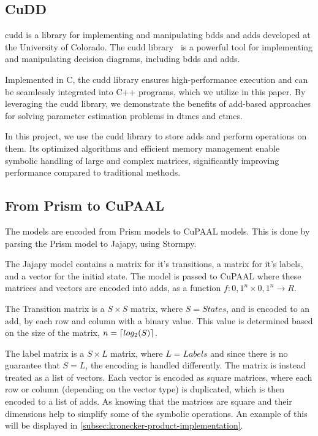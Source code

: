 \subsection{CuDD}\label{subsec:cudd}
\acrfull{cudd} is a library for implementing and manipulating \glspl{bdd} and \glspl{add} developed at the University of Colorado.
The \gls{cudd} library~\cite{somenzi1997cudd} is a powerful tool for implementing and manipulating decision diagrams, including \glspl{bdd} and \glspl{add}.

Implemented in C, the \gls{cudd} library ensures high-performance execution and can be seamlessly integrated into C++ programs, which we utilize in this paper.
By leveraging the \gls{cudd} library, we demonstrate the benefits of \gls{add}-based approaches for solving parameter estimation problems in \glspl{dtmc} and \glspl{ctmc}.

In this project, we use the \gls{cudd} library to store \glspl{add} and perform operations on them.
Its optimized algorithms and efficient memory management enable symbolic handling of large and complex matrices, significantly improving performance compared to traditional methods.



\subsection{From Prism to CuPAAL}\label{subsec:from_prism_to_cupaal}
The models are encoded from Prism models to CuPAAL models. This is done by parsing the Prism model to Jajapy, using Stormpy.

The Jajapy model contains a matrix for it's transitions, a matrix for it's labels, and a vector for the initial state.
The model is passed to CuPAAL where these matrices and vectors are encoded into \glspl{add}, as a function $f \colon {0,1}^n \times {0,1}^n \to R$.

The Transition matrix is a $S\times S$ matrix, where $S=States$, and is encoded to an \gls{add}, by each row and column with a binary value. This value is determined based on the size of the matrix,
$n = \left\lceil log_2(S) \right\rceil$.

The label matrix is a $S\times L$ matrix, where $L=Labels$ and since there is no guarantee that $S = L$, the encoding is handled differently.
The matrix is instead treated as a list of vectors.
Each vector is encoded as square matrices, where each row or column (depending on the vector type) is duplicated, which is then encoded to a list of \glspl{add}.
As knowing that the matrices are square and their dimensions help to simplify some of the symbolic operations.
An example of this will be displayed in \autoref{subsec:kronecker-product-implementation}.


